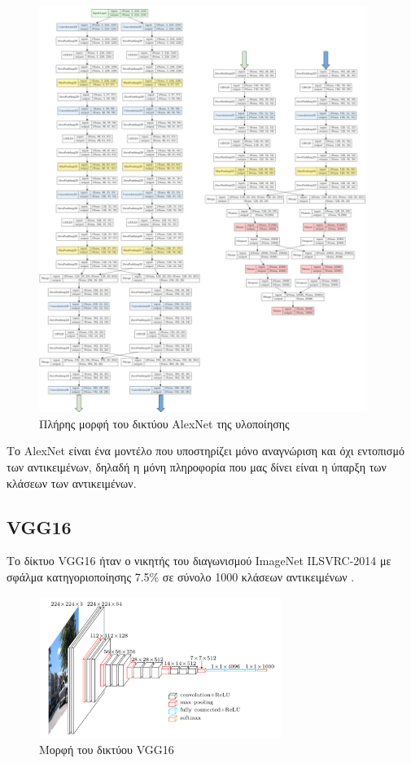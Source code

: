 \begin{figure}[!ht]
  \centering
  \includegraphics[width=0.95\textwidth]{./images/chapter5/alexnet_3.png}
  \caption[Πλήρης μορφή του δικτύου AlexNet της υλοποίησης]{Πλήρης μορφή του δικτύου AlexNet της υλοποίησης}
  \label{fig:alexnet_2}
\end{figure}

Το AlexNet είναι ένα μοντέλο που υποστηρίζει μόνο αναγνώριση και όχι εντοπισμό
των αντικειμένων, δηλαδή η μόνη πληροφορία που μας δίνει είναι η ύπαρξη των κλάσεων των
αντικειμένων.

\subsection{VGG16}

Το δίκτυο VGG16 ήταν ο νικητής του διαγωνισμού ImageNet ILSVRC-2014 με σφάλμα
κατηγοριοποίησης 7.5\% σε σύνολο 1000 κλάσεων αντικειμένων \cite{Simonyan14c}.

\begin{figure}[!ht]
  \centering
  \includegraphics[width=0.7\textwidth]{./images/chapter5/vgg16_from_paper.png}
  \caption[Mορφή του δικτύου VGG16]{Μορφή του δικτύου VGG16}
  \label{fig:vgg16_from_paper}
\end{figure}

